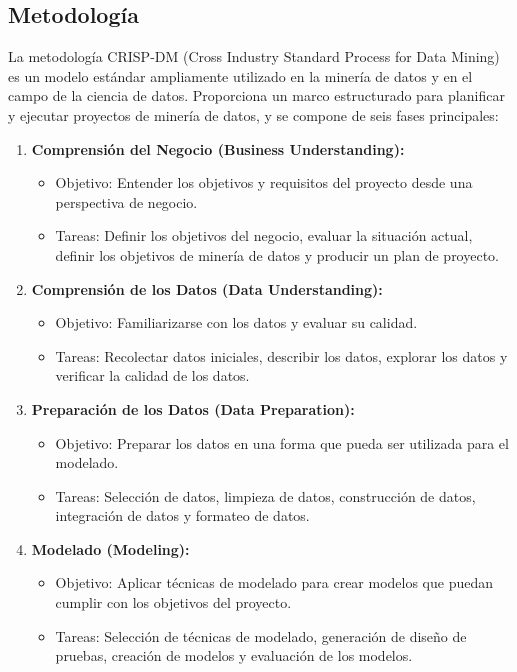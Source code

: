 \documentclass{article}
\begin{document}
\subsection{Metodología}

La metodología CRISP-DM (Cross Industry Standard Process for Data Mining) es un modelo estándar ampliamente utilizado en la minería de datos y en el campo de la ciencia de datos. Proporciona un marco estructurado para planificar y ejecutar proyectos de minería de datos, y se compone de seis fases principales:

\begin{enumerate}
\item \textbf{Comprensión del Negocio (Business Understanding):}

\begin{itemize}
\item Objetivo: Entender los objetivos y requisitos del proyecto desde una perspectiva de negocio.
\item Tareas: Definir los objetivos del negocio, evaluar la situación actual, definir los objetivos de minería de datos y producir un plan de proyecto.
\end{itemize}

\item \textbf{Comprensión de los Datos (Data Understanding):}

\begin{itemize}
\item Objetivo: Familiarizarse con los datos y evaluar su calidad.
\item Tareas: Recolectar datos iniciales, describir los datos, explorar los datos y verificar la calidad de los datos.
\end{itemize}

\item \textbf{Preparación de los Datos (Data Preparation):}

\begin{itemize}
\item Objetivo: Preparar los datos en una forma que pueda ser utilizada para el modelado.
\item Tareas: Selección de datos, limpieza de datos, construcción de datos, integración de datos y formateo de datos.
\end{itemize}

\item \textbf{Modelado (Modeling):}

\begin{itemize}
\item Objetivo: Aplicar técnicas de modelado para crear modelos que puedan cumplir con los objetivos del proyecto.
\item Tareas: Selección de técnicas de modelado, generación de diseño de pruebas, creación de modelos y evaluación de los modelos.
\end{itemize}


\end{enumerate}
\end{document}
